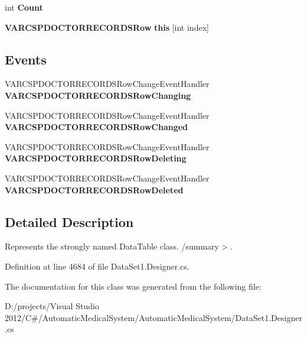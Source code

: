 \begin{CompactItemize}
\item 
int \textbf{Count}\hspace{0.3cm}{\tt  [get]}\label{class_automatic_medical_system_1_1_data_set1_1_1_v_a_r_c_s_p_d_o_c_t_o_r_r_e_c_o_r_d_s_data_table_935c972b7fe32eee21b88ba178817f41}

\item 
{\bf VARCSPDOCTORRECORDSRow} \textbf{this} [int index]\hspace{0.3cm}{\tt  [get]}\label{class_automatic_medical_system_1_1_data_set1_1_1_v_a_r_c_s_p_d_o_c_t_o_r_r_e_c_o_r_d_s_data_table_cfd305baf4ea82b975001ef142cf4171}

\end{CompactItemize}
\subsection*{Events}
\begin{CompactItemize}
\item 
VARCSPDOCTORRECORDSRowChangeEventHandler \textbf{VARCSPDOCTORRECORDSRowChanging}\label{class_automatic_medical_system_1_1_data_set1_1_1_v_a_r_c_s_p_d_o_c_t_o_r_r_e_c_o_r_d_s_data_table_71edbf44b364a68bf5fda1d8a5f2e6ec}

\item 
VARCSPDOCTORRECORDSRowChangeEventHandler \textbf{VARCSPDOCTORRECORDSRowChanged}\label{class_automatic_medical_system_1_1_data_set1_1_1_v_a_r_c_s_p_d_o_c_t_o_r_r_e_c_o_r_d_s_data_table_c3e7cdde138d4cd122efd0f78ebe16b0}

\item 
VARCSPDOCTORRECORDSRowChangeEventHandler \textbf{VARCSPDOCTORRECORDSRowDeleting}\label{class_automatic_medical_system_1_1_data_set1_1_1_v_a_r_c_s_p_d_o_c_t_o_r_r_e_c_o_r_d_s_data_table_eab4d3a3bb689f1e2dc00ba95a633567}

\item 
VARCSPDOCTORRECORDSRowChangeEventHandler \textbf{VARCSPDOCTORRECORDSRowDeleted}\label{class_automatic_medical_system_1_1_data_set1_1_1_v_a_r_c_s_p_d_o_c_t_o_r_r_e_c_o_r_d_s_data_table_6dd20edafe586a5298356090f0007e78}

\end{CompactItemize}


\subsection{Detailed Description}
Represents the strongly named DataTable class. /summary$>$. 

Definition at line 4684 of file DataSet1.Designer.cs.

The documentation for this class was generated from the following file:\begin{CompactItemize}
\item 
D:/projects/Visual Studio 2012/C\#/AutomaticMedicalSystem/AutomaticMedicalSystem/DataSet1.Designer.cs\end{CompactItemize}
